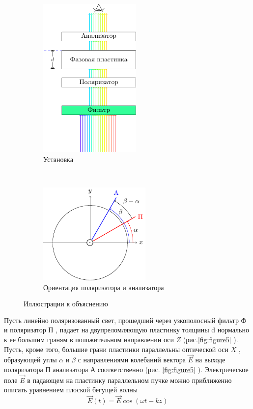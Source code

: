 \begin{figure}[t!]
    \centering
    \begin{subfigure}[c]{0.5\textwidth}
        \centering
        \includegraphics[height=8cm]{ris/ris1.pdf}
        \caption{Установка}
    \end{subfigure}%
    ~ 
    \begin{subfigure}[c]{0.5\textwidth}
        \centering
        \includegraphics[height=5cm]{ris/ris1b}
        \caption{Ориентация поляризатора и анализатора}
    \end{subfigure}
    \caption{Иллюстрации к объяснению}

\end{figure} 

Пусть линейно поляризованный свет, прошедший через узкопо­лосный фильтр $\text{Ф}$ и поляризатор $\text{П}$ , падает на двупреломляющую пластинку толщины d нормально к ее большим граням в
положительном направлении оси $Z$ (рис.\ref{fig:figure5} ). Пусть, кроме того,
большие грани пластинки параллельны оптической оси $X$ , образующей углы $\alpha$ и $\beta$ с направлениями колебаний вектора $\vec{E}$
на выходе поляризатора П анализатора А соответственно
(рис. \ref{fig:figure5} ). Электрическое поле $\vec{E}$ в падающем на пластинку параллель­ном пучке можно приближенно описать уравнением плоской бегущей
волны 
\begin{equation}
	\vec{E}(t)=\vec{E}\cos(\omega t-kz)
\end{equation}



